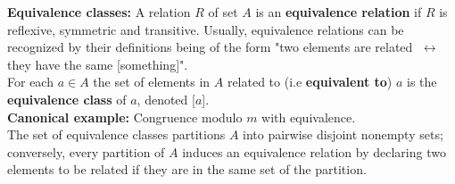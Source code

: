 \documentclass[12pt]{article}
\renewcommand{\iff}{\;\leftrightarrow\;}
\begin{document}
\textbf{Equivalence classes:} A relation $R$ of set $A$ is an \textbf{equivalence relation} if $R$ is reflexive, symmetric and transitive. Usually, equivalence relations can be recognized by their definitions being of the form "two elements are related $\iff$ they have the same [something]". \\
For each $a \in A$ the set of elements in $A$ related to (i.e \textbf{equivalent to}) $a$ is the \textbf{equivalence class} of $a$, denoted [$a$]. \\
\textbf{Canonical example:} Congruence modulo $m$ with equivalence. \\
The set of equivalence classes partitions $A$ into pairwise disjoint nonempty sets; conversely, every partition of $A$ induces an equivalence relation by declaring two elements to be related if they are in the same set of the partition. 
\newpage
\end{document}
